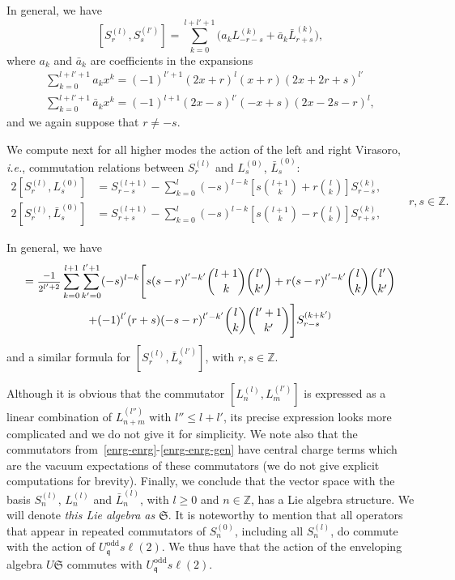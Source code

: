 \documentclass[11pt]{article}
\newcommand{\q}{\mathfrak{q}}
\newcommand{\ffrac}[2]{\mbox{\footnotesize$\displaystyle\frac{#1}{#2}$}}
\newcommand{\LQGodd}{U^{\text{odd}}_{\q} s\ell(2)}
\newcommand{\oZ}{\mathbb{Z}}
\newcommand{\interLie}{\mathfrak{S}}
\newcommand{\interch}{\interLie}
\newcommand{\enrg}{S}
\newcommand{\virm}[1]{L^{(#1)}}
\newcommand{\bvirm}[1]{\bar{L}^{(#1)}}
\theoremstyle{definition}
\begin{document}
In general, we have
\begin{equation}\label{enrg-enrg-gen}
[\enrg^{(l)}_r,\enrg^{(l')}_s] = \sum_{k=0}^{l+l'+1}\bigl(a_k\virm{k}_{-r-s} +\bar{a}_k\bvirm{k}_{r+s}\bigr),
\end{equation}
where $a_k$ and  $\bar{a}_k$ are coefficients in the expansions
\begin{gather}
\sum_{k=0}^{l+l'+1}a_k x^k = (-1)^{l'+1}(2x+r)^l(x+r)(2x+2r+s)^{l'}\\
\sum_{k=0}^{l+l'+1}\bar{a}_k x^k = (-1)^{l+1}(2x-s)^{l'}(-x+s)(2x-2s-r)^{l},
\end{gather}
and we again suppose that $r\ne-s$.

We compute next  for all higher modes the action of the left  and right Virasoro, {\it i.e.}, commutation relations between $\enrg^{(l)}_r$ and
$\virm{0}_s$, $\bvirm{0}_s$:
\begin{equation}\label{comm-rel-enrg-Ln}
\begin{split}
2[\enrg^{(l)}_r,\virm{0}_s] &= \enrg^{(l+1)}_{r-s} - \sum_{k=0}^l (-s)^{l-k}\left[s\binom{l+1}{k}+r\binom{l}{k}\right] \enrg^{(k)}_{r-s},\\
2[\enrg^{(l)}_r,\bvirm{0}_s] &= \enrg^{(l+1)}_{r+s} - \sum_{k=0}^l (-s)^{l-k}\left[s\binom{l+1}{k}-r\binom{l}{k}\right] \enrg^{(k)}_{r+s},
\end{split}
\qquad r,s\in\oZ.
\end{equation}



In general, we have
\begin{multline}
[\enrg^{(l)}_r,\virm{l'}_s] = \ffrac{-1}{2^{l'+2}} \sum_{k=0}^{l+1}\sum_{k'=0}^{l'+1} (-s)^{l-k}
\Biggl[s(s-r)^{l'-k'}\binom{l+1}{k}\binom{l'}{k'} + r(s-r)^{l'-k'}\binom{l}{k}\binom{l'}{k'}\\
+(-1)^{l'}(r+s)(-s-r)^{l'-k'}\binom{l}{k}\binom{l'+1}{k'}\Biggr] \enrg^{(k+k')}_{r-s}
\end{multline}
and a similar formula for $[\enrg^{(l)}_r,\bvirm{l'}_s]$, with  $r,s\in\oZ$.


Although it is obvious that the commutator $[\virm{l}_n,\virm{l'}_m]$ is expressed as a linear combination of $\virm{l''}_{n+m}$ with $l''\leq l+l'$, its precise expression  looks more complicated and we do not give it for simplicity. We note also that the commutators from~\eqref{enrg-enrg}-\eqref{enrg-enrg-gen} have central charge terms which are the vacuum expectations of these commutators (we do not give explicit computations for brevity).  Finally, we  conclude that the vector space with the basis $\enrg^{(l)}_n$, $\virm{l}_n$ and $\bvirm{l}_n$, with $l\geq0$ and $n\in\oZ$, has a Lie algebra structure. We will denote  \textit{this Lie algebra as $\interch$}.
It is noteworthy to mention that all operators that appear in
 repeated commutators of  $\enrg^{(0)}_n$, including all
 $\enrg^{(l)}_n$, do commute
 with the action of $\LQGodd$. We thus have that the action of the enveloping algebra $U\interch$ commutes with $\LQGodd$.
\end{document}
